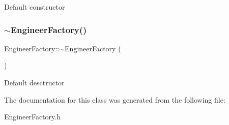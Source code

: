 Default constructor \mbox{\label{classEngineerFactory_af892e0d4b047414dbcefee0bbe943208}} 
\subsubsection{\texorpdfstring{$\sim$\+Engineer\+Factory()}{~EngineerFactory()}}
{\footnotesize\ttfamily Engineer\+Factory\+::$\sim$\+Engineer\+Factory (\begin{DoxyParamCaption}{ }\end{DoxyParamCaption})}

Default desctructor 

The documentation for this class was generated from the following file\+:\begin{DoxyCompactItemize}
\item 
Engineer\+Factory.\+h\end{DoxyCompactItemize}
